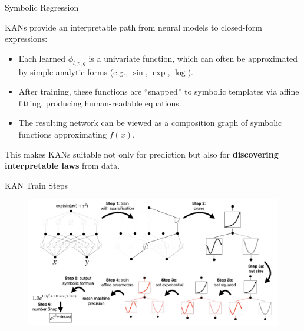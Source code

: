 \documentclass[aspectratio=169]{beamer}
\begin{document}

\begin{frame}{Symbolic Regression}
	
	KANs provide an interpretable path from neural models to closed-form expressions:
	
	\begin{itemize}
		\item Each learned $\phi_{l,p,q}$ is a univariate function, which can often be approximated by simple analytic forms (e.g., $\sin$, $\exp$, $\log$).
		\item After training, these functions are ``snapped'' to symbolic templates via affine fitting, producing human-readable equations.
		\item The resulting network can be viewed as a composition graph of symbolic functions approximating $f(x)$.
	\end{itemize}
	
	This makes KANs suitable not only for prediction but also for \textbf{discovering interpretable laws} from data.
	
\end{frame}


\begin{frame}{KAN Train Steps}
	
	\begin{figure}
		\centering
		\includegraphics[width=\linewidth]{../images/kan_training.png}
	\end{figure}
	
\end{frame}
\end{document}
